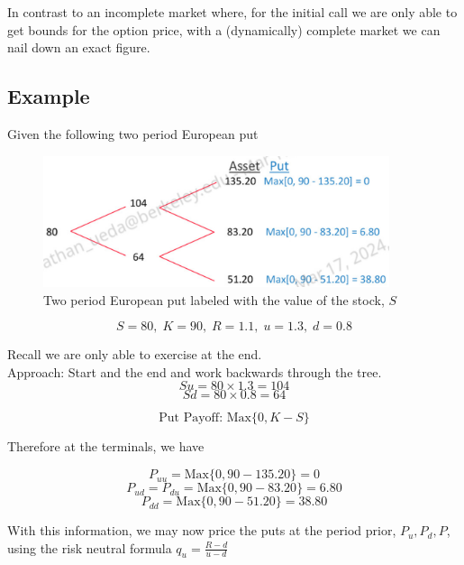 \documentclass[11pt]{article}
\begin{document}
In contrast to an incomplete market where, for the initial call we are only able to get bounds
for the option price, with a (dynamically) complete market we can nail down an exact figure. 


\subsection{Example}

Given the following two period European put 

\begin{figure}[H] 
    \centering 
    \includegraphics[width=4in]{imgs/two_period_euorpean_put.png}
    \caption{Two period European put labeled with the value of the stock, $S$} 
\end{figure}

\[S = 80, \; K = 90, \; R=1.1, \; u = 1.3, \; d = 0.8\]

Recall we are only able to exercise at the end. \\

Approach: Start and the end and work backwards through the tree. \\  

\[ Su = 80 \times 1.3 = 104 \]
\[ Sd = 80 \times 0.8 = 64 \]

\[\text{Put Payoff: Max}\{0, K - S\}\]

Therefore at the terminals, we have

\[P_{uu} = \text{Max}\{0, 90 - 135.20\} = 0\]
\[P_{ud} = P_{du} = \text{Max}\{0, 90 - 83.20\} = 6.80\]
\[P_{dd} = \text{Max}\{0, 90 - 51.20\} = 38.80\]

With this information, we may now price the puts at the period prior, $P_u, P_d, P$, using the
risk neutral formula $q_u = \frac{R-d}{u-d}$
\end{document}
